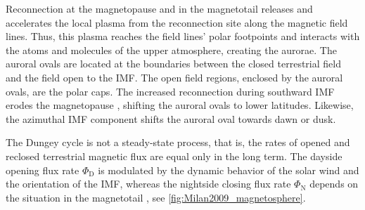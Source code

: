 Reconnection at the magnetopause and in the magnetotail releases and accelerates the local plasma from the reconnection site along the magnetic field lines. Thus, this plasma reaches the field lines' polar footpoints and interacts with the atoms and molecules of the upper atmosphere, creating the aurorae. The auroral ovals are located at the boundaries between the closed terrestrial field and the field open to the IMF. The open field regions, enclosed by the auroral ovals, are the polar caps. The increased reconnection during southward IMF erodes the magnetopause \citep{Aubry1970}, shifting the auroral ovals to lower latitudes. Likewise, the azimuthal IMF component shifts the auroral oval towards dawn or dusk.

The Dungey cycle is not a steady-state process, that is, the rates of opened and reclosed terrestrial magnetic flux are equal only in the long term. The dayside opening flux rate $\Phi_\text{D}$ is modulated by the dynamic behavior of the solar wind and the orientation of the IMF, whereas the nightside closing flux rate $\Phi_\text{N}$ depends on the situation in the magnetotail \citep{Milan2007}, see \autoref{fig:Milan2009_magnetosphere}.
\begin{figure}[htb]
\end{figure}
